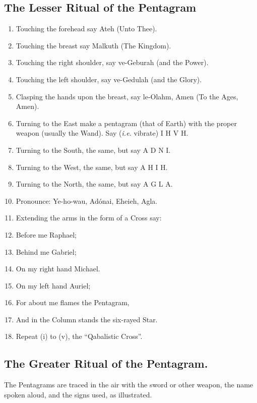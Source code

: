 \subsection*{The Lesser Ritual of the Pentagram}
\begin{enumerate}[label=(\Roman*)]
\item Touching the forehead say Ateh (Unto Thee).
\item Touching the breast say Malkuth (The Kingdom).
\item Touching the right shoulder, say ve-Geburah (and the Power).
\item Touching the left shoulder, say ve-Gedulah (and the Glory).
\item Clasping the hands upon the breast, say le-Olahm, Amen (To the Ages, Amen).
\item Turning to the East make a pentagram (that of Earth) with the proper weapon (usually the Wand). Say (\textit{i.e.} vibrate) \linebreak[2] I H V H.
\item Turning to the South, the same, but say \linebreak[2] A D N I.
\item Turning to the West, the same, but say \linebreak[2] A H I H.
\item Turning to the North, the same, but say \linebreak[2] A G L A.
\item[] Pronounce: Ye-ho-wau, Ad\'{o}nai, Eheieh, Agla.
\item Extending the arms in the form of a Cross say:
\item Before me Raphael;
\item Behind me Gabriel;
\item On my right hand Michael.
\item On my left hand Auriel;
\item For about me flames the Pentagram,
\item And in the Column stands the six-rayed Star.
\item[] Repeat (i) to (v), the \enquote{Qabalistic Cross}.
\end{enumerate}

\subsection*{The Greater Ritual of the Pentagram.}
The Pentagrams are traced in the air with the sword or other weapon, the name spoken aloud, and the signs used, as illustrated.

